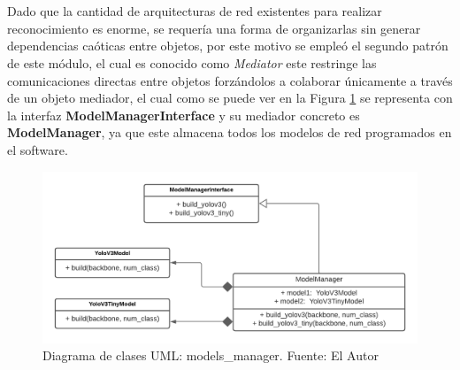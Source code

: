 \\
\\ 
Dado que la cantidad de arquitecturas de red existentes para realizar reconocimiento es enorme, se requería una forma de organizarlas sin generar dependencias caóticas entre objetos, por este motivo se empleó el segundo patrón de este módulo, el cual es conocido como \textit{Mediator} este restringe las comunicaciones directas entre objetos forzándolos a colaborar únicamente a través de un objeto mediador, el cual como se puede ver en la Figura \ref{models_manager_uml} se representa con la interfaz \textbf{ModelManagerInterface} y su mediador concreto es \textbf{ModelManager}, ya que este almacena todos los modelos de red programados en el software.
\begin{figure}[H]
    \centering
    \includegraphics[scale=0.5]{Recursos/Model_Manager_uml.png}
    \caption[Diagrama de clases UML: models\_manager.]{Diagrama de clases UML: models\_manager. {\footnotesize Fuente: El Autor}}
    \label{models_manager_uml}
\end{figure}
